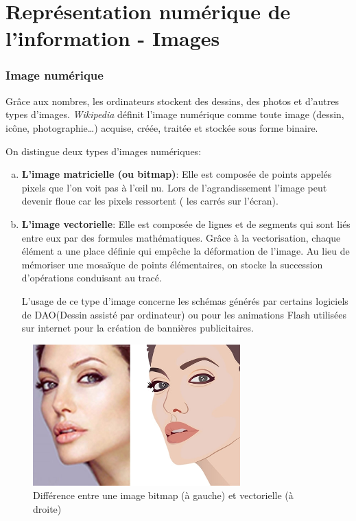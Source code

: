 \documentclass[11pt, a4paper]{book}
\begin{document}
\setcounter{chapter}{1}
\chapter{Représentation numérique de l’information - Images}

\subsection{Image numérique}

Grâce aux nombres, les ordinateurs stockent des dessins, des photos et d’autres types d’images.
{\it Wikipedia} définit l'image numérique  comme toute image (dessin, icône, photographie…) acquise, créée, traitée et stockée sous forme binaire.

On distingue deux types d’images numériques:
\begin{enumerate}[a)]
\item {\bf L'image matricielle (ou bitmap)}:
Elle est composée de points appelés pixels que l’on voit pas à l'œil nu. Lors de l’agrandissement l’image peut devenir floue car les pixels ressortent ( les carrés sur l’écran).
\item {\bf L'image vectorielle}:
Elle est composée de lignes et de segments qui sont liés entre eux par des formules mathématiques. Grâce à la vectorisation, chaque élément a une place définie qui empêche la déformation de l’image. Au lieu de mémoriser une mosaïque de points élémentaires, on stocke la succession d’opérations conduisant au tracé.

L’usage de ce type d’image concerne les schémas générés par certains logiciels de DAO(Dessin assisté par ordinateur) ou pour les animations Flash utilisées sur internet pour la création de bannières publicitaires.

\end{enumerate}

\begin{center}
\begin{figure}
\centering
\includegraphics[width=8cm]{images/bitmapvectoriel}
\caption{Différence entre une image bitmap (à gauche) et vectorielle (à droite)}
\end{figure}
\end{center}
\end{document}
